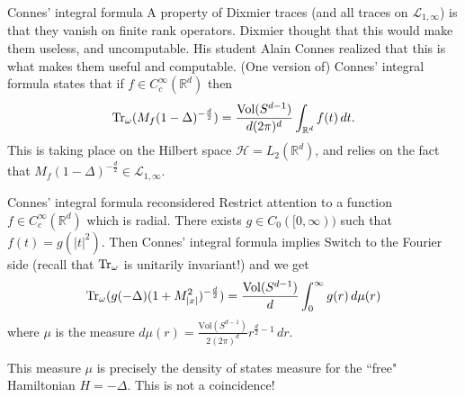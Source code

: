 \documentclass{beamer}
\numberwithin{equation}{section}
\theoremstyle{plain}
\theoremstyle{plain}
\theoremstyle{definition}
\theoremstyle{plain}
\theoremstyle{plain}
\theoremstyle{definition}
\newcommand{\tr}{{\rm Tr}}
\newcommand{\Vol}{\mathrm{Vol}}
\newcommand{\Rl}{\mathbb{R}}
\begin{document}
\begin{frame}{Connes' integral formula}
    A property of Dixmier traces (and all traces on $\mathcal{L}_{1,\infty}$) is that they vanish on finite rank operators. Dixmier thought that this would
    make them useless, and uncomputable.
    \pause
    His student Alain Connes realized that this is what makes them useful and computable. (One version of) Connes' integral formula states that
    if $f \in C^\infty_c(\Rl^d)$ then
    $$
        \tr_{\omega}(M_f(1-\Delta)^{-\frac{d}{2}}) = \frac{\Vol(S^{d-1})}{d(2\pi)^d}\int_{\Rl^d} f(t)\,dt.
    $$     
    This is taking place on the Hilbert space $\mathcal{H} = L_2(\Rl^d)$, and relies on the fact that $M_f(1-\Delta)^{-\frac{d}{2}} \in \mathcal{L}_{1,\infty}$.
\end{frame}

% 

\begin{frame}{Connes' integral formula reconsidered}
    Restrict attention to a function $f \in C^\infty_c(\Rl^d)$ which is radial. There exists $g \in C_0([0,\infty))$ such that $f(t) = g(|t|^2)$. Then Connes' integral formula implies
    Switch to the Fourier side (recall that $\tr_{\omega}$ is unitarily invariant!) and we get
    $$
        \tr_{\omega}(g(-\Delta)(1+M_{|x|}^2)^{-\frac{d}{2}}) = \frac{\Vol(S^{d-1})}{d}\int_0^{\infty} g(r) \,d\mu(r)
    $$
    where $\mu$ is the measure $d\mu(r) = \frac{\Vol(S^{d-1})}{2(2\pi)^d}r^{\frac{d}{2}-1}\,dr.$
     
    This measure $\mu$ is precisely the density of states measure for the ``free" Hamiltonian $H = -\Delta$. This is not a coincidence!
\end{frame}
\end{document}
